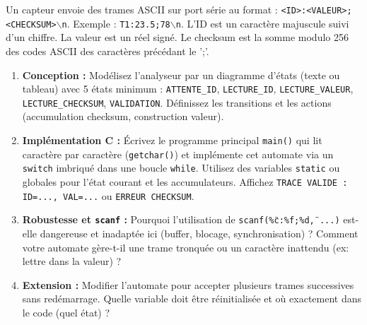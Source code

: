 \documentclass[11pt]{article}
\begin{document}
\begin{exercice}
Un capteur envoie des trames ASCII sur port série au format : \texttt{<ID>:<VALEUR>;<CHECKSUM>$\backslash$n}. Exemple : \texttt{T1:23.5;78$\backslash$n}. L'ID est un caractère majuscule suivi d'un chiffre. La valeur est un réel signé. Le checksum est la somme modulo 256 des codes ASCII des caractères précédant le ';'.
\begin{enumerate}
    \item \textbf{Conception :} Modélisez l'analyseur par un diagramme d'états (texte ou tableau) avec 5 états minimum : \texttt{ATTENTE\_ID}, \texttt{LECTURE\_ID}, \texttt{LECTURE\_VALEUR}, \texttt{LECTURE\_CHECKSUM}, \texttt{VALIDATION}. Définissez les transitions et les actions (accumulation checksum, construction valeur).
    \item \textbf{Implémentation C :} Écrivez le programme principal \texttt{main()} qui lit caractère par caractère (\texttt{getchar()}) et implémente cet automate via un \texttt{switch} imbriqué dans une boucle \texttt{while}. Utilisez des variables \texttt{static} ou globales pour l'état courant et les accumulateurs. Affichez \texttt{TRACE VALIDE : ID=..., VAL=...} ou \texttt{ERREUR CHECKSUM}.
    \item \textbf{Robustesse et \texttt{scanf} :} Pourquoi l'utilisation de \texttt{scanf(\"\%c:\%f;\%d\", ...)} est-elle dangereuse et inadaptée ici (buffer, blocage, synchronisation) ? Comment votre automate gère-t-il une trame tronquée ou un caractère inattendu (ex: lettre dans la valeur) ?
    \item \textbf{Extension :} Modifier l'automate pour accepter plusieurs trames successives sans redémarrage. Quelle variable doit être réinitialisée et où exactement dans le code (quel état) ?
\end{enumerate}
\end{exercice}
\end{document}
